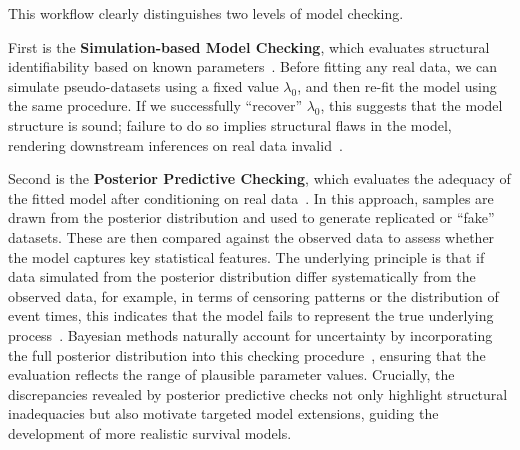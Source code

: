 This workflow clearly distinguishes two levels of model checking.

First is the \textbf{Simulation-based Model Checking}, which evaluates structural identifiability based on known parameters~\cite{10.1093/bioinformatics/btp358}. Before fitting any real data, we can simulate pseudo-datasets using a fixed value $\lambda_0$, and then re-fit the model using the same procedure. If we successfully “recover” $\lambda_0$, this suggests that the model structure is sound; failure to do so implies structural flaws in the model, rendering downstream inferences on real data invalid~\cite{10.1093/bioinformatics/btp358, pub.1044073403}.

Second is the \textbf{Posterior Predictive Checking}, which evaluates the adequacy of the fitted model after conditioning on real data~\cite{https://doi.org/10.1002/ecm.1314}. In this approach, samples are drawn from the posterior distribution and used to generate replicated or “fake” datasets. These are then compared against the observed data to assess whether the model captures key statistical features. The underlying principle is that if data simulated from the posterior distribution differ systematically from the observed data, for example, in terms of censoring patterns or the distribution of event times, this indicates that the model fails to represent the true underlying process~\cite{62bfc978-09b1-3997-9776-380d0b45e9c2}. Bayesian methods naturally account for uncertainty by incorporating the full posterior distribution into this checking procedure~\cite{van2021bayesian}, ensuring that the evaluation reflects the range of plausible parameter values. Crucially, the discrepancies revealed by posterior predictive checks not only highlight structural inadequacies but also motivate targeted model extensions, guiding the development of more realistic survival models.


